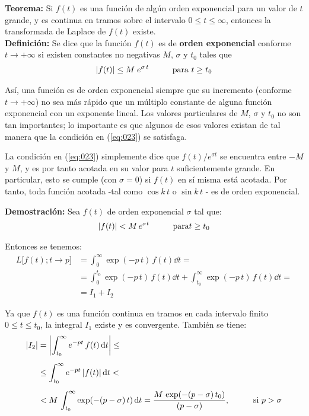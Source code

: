 \noindent \textbf{Teorema: } Si $f(t)$ es una función de algún orden exponencial para un valor de $t$ grande, y es continua en tramos sobre el intervalo $0 \leq t \leq \infty$, entonces la transformada de Laplace de $f(t)$ existe.
\\[0.5em]
\textbf{Definición: } Se dice que la función $f(t)$ es de \textbf{orden exponencial} conforme $t \to + \infty$ si existen constantes no negativas $M$, $\sigma$ y $t_{0}$ tales que
\begin{align}
\abs{f(t)} \leq M \; e^{\sigma \, t} \hspace{1cm} \mbox{para } t \geq t_{0}
\label{eq:023}
\end{align}

Así, una función es de orden exponencial siempre que su incremento (conforme $t \to + \infty$) no sea más rápido que un múltiplo constante de alguna función exponencial con un exponente lineal. Los valores particulares de $M$, $\sigma$ y $t_{0}$ no son tan importantes; lo importante es que algunos de esos valores existan de tal manera que la condición en (\ref{eq:023}) se satisfaga.
\par
La condición en (\ref{eq:023}) simplemente dice que $f(t) / e^{\sigma t}$ se encuentra entre $-M$ y $M$, y es por tanto acotada en su valor para $t$ suficientemente grande. En particular, esto se cumple (con $\sigma = 0$) si $f(t)$ en sí misma está acotada. Por tanto, toda función acotada -tal como $\cos k \, t$ o $\sin k \, t$ - es de orden exponencial.
\par
\noindent \textbf{Demostración: } Sea $f(t)$ de orden exponencial $\sigma$ tal que:
\begin{align*}
\abs{f(t)} < M \, e^{\sigma t} \hspace{1cm} \mbox{para} t \geq t_{0}
\end{align*}

Entonces se tenemos:
\begin{align*}
L \big[f(t); t \to p\big] &= \int_{0}^{\infty} \exp(-p \, t) \, f(t) \dd{t} = \\[0.5em]
&= \int_{0}^{t_{0}} \exp(-p \, t) \, f(t) \dd{t} + \int_{t_{0}}^{\infty} \exp(-p \, t) \, f(t) \dd{t} = \\[0.5em]
&= I_{1} + I_{2}
\end{align*}

Ya que $f(t)$ es una función continua en tramos en cada intervalo finito $0 \leq t \leq t_{0}$, la integral $I_{1}$ existe y es convergente. También se tiene:
\begin{align*}
\abs{I_{2}} &= \abs{\int_{t_{0}}^{\infty} e^{- p t} \, f(t) \dd{t}} \leq \\[0.5em]
&\leq \int_{t_{0}}^{\infty} e^{- p t} \, \abs{f(t)} \dd{t} < \\[0.5em]
&< M \, \int_{t_{0}}^{\infty} \exp(-(p - \sigma) \, t) \dd{t} = \dfrac{M \, \exp(-(p - \sigma) \, t_{0})}{(p - \sigma)}, \hspace{1cm} \mbox{si  } p > \sigma
\end{align*}

